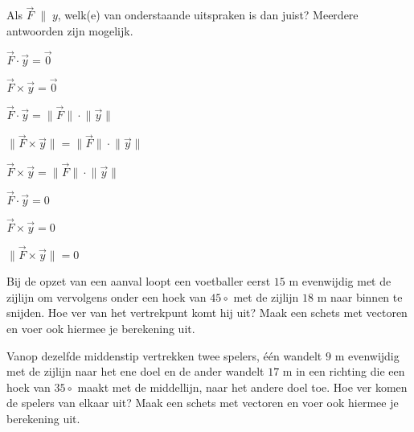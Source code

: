 \documentclass{ximera}
\begin{document}
\begin{exercise}
	
Als \(\vec{F} \; \| \; y\), welk(e) van onderstaande uitspraken is dan juist? 
Meerdere antwoorden zijn mogelijk. 

\begin{question}
\(\vec{F} \cdot \vec{y} = \vec{0}\)
\end{question}

\begin{question}
\(\vec{F} \times \vec{y} = \vec{0}\)
\end{question}

\begin{question}
\(\vec{F} \cdot \vec{y} = \lVert \vec{F} \rVert \cdot \lVert \vec{y} \rVert\)	
\end{question}

\begin{question}
\(\lVert \vec{F} \times \vec{y} \rVert = \lVert \vec{F} \rVert \cdot \lVert \vec{y} \rVert\)	
\end{question}

\begin{question}
\(\vec{F} \times \vec{y} = \lVert \vec{F} \rVert \cdot \lVert \vec{y} \rVert\)	
\end{question}

\begin{question}
\(\vec{F} \cdot \vec{y} = 0\)
\end{question}

\begin{question}
\(\vec{F} \times \vec{y} = 0\)
\end{question}

\begin{question}
\(\lVert \vec{F} \times \vec{y} \rVert = 0\)
\end{question}
	
\end{exercise}
	


\begin{exercise}
Bij de opzet van een aanval loopt een voetballer eerst \(15\) m evenwijdig met de zijlijn om vervolgens onder een hoek van \(45\circ\) met de zijlijn \(18\) m naar binnen te snijden. 
Hoe ver van het vertrekpunt komt hij uit? Maak een schets met vectoren en voer ook hiermee je berekening uit.
\end{exercise}

\begin{exercise}
Vanop dezelfde middenstip vertrekken twee spelers, één wandelt \(9\) m evenwijdig met de zijlijn naar het ene doel en de ander wandelt \(17\) m in een richting die een hoek van \(35\circ\) maakt met de middellijn, naar het andere doel toe. Hoe ver komen de spelers van elkaar uit? Maak een schets met vectoren en voer ook hiermee je berekening uit.
\end{exercise}
\end{document}
